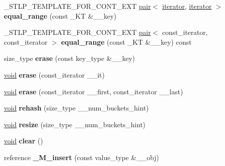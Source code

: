 \begin{DoxyCompactItemize}
\+\_\+\+S\+T\+L\+P\+\_\+\+T\+E\+M\+P\+L\+A\+T\+E\+\_\+\+F\+O\+R\+\_\+\+C\+O\+N\+T\+\_\+\+E\+XT \hyperlink{structpair}{pair}$<$ \hyperlink{structiterator}{iterator}, \hyperlink{structiterator}{iterator} $>$ {\bfseries equal\+\_\+range} (const \+\_\+\+KT \&\+\_\+\+\_\+key)
\item 
\mbox{\label{classhashtable_a79fe7edebd28031966c8f5f57ea86145}} 
\+\_\+\+S\+T\+L\+P\+\_\+\+T\+E\+M\+P\+L\+A\+T\+E\+\_\+\+F\+O\+R\+\_\+\+C\+O\+N\+T\+\_\+\+E\+XT \hyperlink{structpair}{pair}$<$ const\+\_\+iterator, const\+\_\+iterator $>$ {\bfseries equal\+\_\+range} (const \+\_\+\+KT \&\+\_\+\+\_\+key) const
\item 
\mbox{\label{classhashtable_a1974a9a3cfd47c0735950b94c4257db4}} 
size\+\_\+type {\bfseries erase} (const key\+\_\+type \&\+\_\+\+\_\+key)
\item 
\mbox{\label{classhashtable_aef92d17ec1239320db088fcafdedab18}} 
\hyperlink{interfacevoid}{void} {\bfseries erase} (const\+\_\+iterator \+\_\+\+\_\+it)
\item 
\mbox{\label{classhashtable_a91aa73feb515a86fd2c92213d5bbba14}} 
\hyperlink{interfacevoid}{void} {\bfseries erase} (const\+\_\+iterator \+\_\+\+\_\+first, const\+\_\+iterator \+\_\+\+\_\+last)
\item 
\mbox{\label{classhashtable_ac9659e48cdb2f5d1c6ea1a15e25c41c0}} 
\hyperlink{interfacevoid}{void} {\bfseries rehash} (size\+\_\+type \+\_\+\+\_\+num\+\_\+buckets\+\_\+hint)
\item 
\mbox{\label{classhashtable_ad0acccd0331a261cceb46601eb2c4cf0}} 
\hyperlink{interfacevoid}{void} {\bfseries resize} (size\+\_\+type \+\_\+\+\_\+num\+\_\+buckets\+\_\+hint)
\item 
\mbox{\label{classhashtable_acc0ab8ddc2a832b18d760cdf96d2809b}} 
\hyperlink{interfacevoid}{void} {\bfseries clear} ()
\item 
\mbox{\label{classhashtable_a0238c15fe01ab9fa372dbffd282ab0a8}} 
reference {\bfseries \+\_\+\+M\+\_\+insert} (const value\+\_\+type \&\+\_\+\+\_\+obj)
\item 
\mbox{\label{classhashtable_ae08e112dcb9455d40455eb795e37feb9}} 

\end{DoxyCompactItemize}
